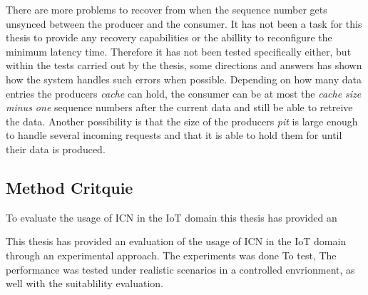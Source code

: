 There are more problems to recover from when the sequence number gets unsynced between the producer and the consumer. 
It has not been a task for this thesis to provide any recovery capabilities or the abillity to reconfigure the minimum latency time. Therefore it has not been tested specifically either, but within the tests carried out by the thesis, some directions and answers has shown how the system handles such errors when possible.
Depending on how many data entries the producers \textit{cache} can hold, the consumer can be at most the \textit{cache size minus one} sequence numbers after the current data and still be able to retreive the data. 
Another possibility is that the size of the producers \textit{pit} is large enough to handle several incoming requests and that it is able to hold them for until their data is produced. 




\subsection{Method Critquie}
To evaluate the usage of ICN in the IoT domain this thesis has provided an

This thesis has provided an evaluation of the usage of ICN in the IoT domain through an experimental approach. The experiments was done
To test, 
The performance was tested under realistic scenarios in a controlled envrionment, as well with the suitablility evaluation.


